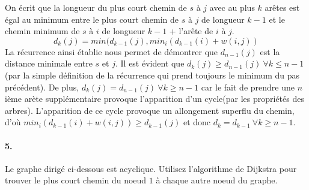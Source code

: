 \begin{solution}
On écrit que la longueur du plus court chemin de $s$ à $j$ avec au plus $k$ arêtes est égal au minimum entre le plus court chemin de $s$ à $j$ de longueur $k-1$ et le chemin minimum de $s$ à $i$ de longueur $k-1$ + l'arête de $i$ à $j$.
$$d_k(j) = min (d_{k-1}(j) , min_i(d_{k-1}(i)+w(i, j))$$
La récurrence ainsi établie nous permet de démontrer que $d_{n-1}(j)$ est la distance minimale entre $s$ et $j$. Il est évident que $d_k(j)\ge d_{n-1}(j)\ \forall k \le n-1$ (par la simple définition de la récurrence qui prend toujours le minimum du pas précédent). De plus, $d_k(j) = d_{n-1}(j)\ \forall k \ge n-1$ car le fait de prendre une $n$ième arète supplémentaire provoque l'apparition d'un cycle(par les propriétés des arbres). L'apparition de ce cycle provoque un allongement superflu du chemin, d'où $min_i(d_{k-1}(i)+w(i, j)) \ge d_{k-1}(j)$ et donc $d_k = d_{k-1}\ \forall k \ge n-1$.
\end{solution}

\paragraph{5. } Le graphe dirigé ci-dessous est acyclique. Utilisez l'algorithme de Dijkstra pour trouver le plus court chemin du noeud $1$ à chaque autre noeud du graphe.

\begin{center}
\end{center}

